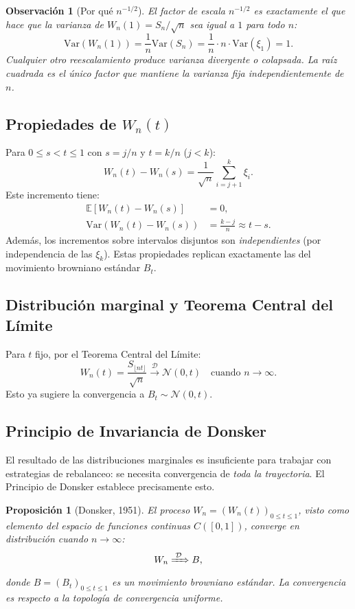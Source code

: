 \documentclass[12pt, a4paper]{article}
\newtheorem{proposicion}[definicion]{Proposición}
\newtheorem{observacion}[definicion]{Observación}
\newcommand{\E}{\mathbb{E}}
\newcommand{\Var}{\mathrm{Var}}
\begin{document}
\begin{observacion}[Por qué $n^{-1/2}$]
El factor de escala $n^{-1/2}$ es exactamente el que hace que la varianza de
$W_n(1) = S_n/\sqrt{n}$ sea igual a $1$ para todo $n$:
\[
  \Var\!\left(W_n(1)\right)
  = \frac{1}{n} \Var(S_n)
  = \frac{1}{n} \cdot n \cdot \Var(\xi_1)
  = 1.
\]
Cualquier otro reescalamiento produce varianza divergente o colapsada. La
raíz cuadrada es el único factor que \emph{mantiene la varianza fija}
independientemente de $n$.
\end{observacion}

\subsection{Propiedades de \texorpdfstring{$W_n(t)$}{Wn(t)}}

Para $0 \le s < t \le 1$ con $s = j/n$ y $t = k/n$ ($j < k$):
\[
  W_n(t) - W_n(s) = \frac{1}{\sqrt{n}} \sum_{i=j+1}^{k} \xi_i.
\]
Este incremento tiene:
\begin{align*}
  \E[W_n(t) - W_n(s)] &= 0, \\
  \Var(W_n(t) - W_n(s)) &= \frac{k-j}{n} \approx t - s.
\end{align*}
Además, los incrementos sobre intervalos disjuntos son \emph{independientes}
(por independencia de las $\xi_k$). Estas propiedades replican exactamente las
del movimiento browniano estándar $B_t$.

\subsection{Distribución marginal y Teorema Central del Límite}

Para $t$ fijo, por el Teorema Central del Límite:
\[
  W_n(t) = \frac{S_{\lfloor nt \rfloor}}{\sqrt{n}}
  \xrightarrow{\;\mathcal{D}\;} \mathcal{N}(0, t) \quad \text{cuando } n \to \infty.
\]
Esto ya sugiere la convergencia a $B_t \sim \mathcal{N}(0,t)$.

\subsection{Principio de Invariancia de Donsker}

El resultado de las distribuciones marginales es insuficiente para trabajar
con estrategias de rebalanceo: se necesita convergencia de \emph{toda la
trayectoria}. El Principio de Donsker establece precisamente esto.

\begin{proposicion}[Donsker, 1951]
El proceso $W_n = (W_n(t))_{0 \le t \le 1}$, visto como elemento del espacio
de funciones continuas $C([0,1])$, converge en distribución cuando $n \to \infty$:
\[
  W_n \xRightarrow{\;\mathcal{D}\;} B,
\]
donde $B = (B_t)_{0 \le t \le 1}$ es un movimiento browniano estándar. La
convergencia es respecto a la topología de convergencia uniforme.
\end{proposicion}
\end{document}
